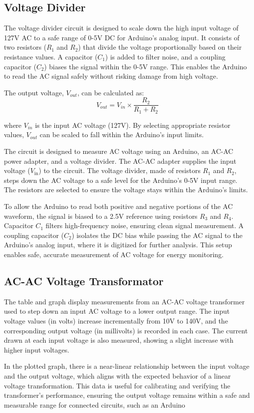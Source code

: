 \subsection{Voltage Divider}
The voltage divider circuit is designed to scale down the high input voltage of 127V AC to a safe range of 0-5V DC for Arduino's analog input. It consists of two resistors ($R_1$ and $R_2$) that divide the voltage proportionally based on their resistance values. A capacitor ($C_1$) is added to filter noise, and a coupling capacitor ($C_2$) biases the signal within the 0-5V range. This enables the Arduino to read the AC signal safely without risking damage from high voltage. \cite{OpenEnergyMonitor_Voltage}

The output voltage, $V_{out}$, can be calculated as:
$$ V_{out} = V_{in} \times \frac{R_2}{R_1 + R_2}$$

where $V_{in}$ is the input AC voltage (127V). By selecting appropriate resistor values, $V_{out}$ can be scaled to fall within the Arduino's input limits.

The circuit is designed to measure AC voltage using an Arduino, an AC-AC power adapter, and a voltage divider. The AC-AC adapter supplies the input voltage (\(V_{\text{in}}\)) to the circuit. The voltage divider, made of resistors \(R_1\) and \(R_2\), steps down the AC voltage to a safe level for the Arduino’s 0-5V input range. The resistors are selected to ensure the voltage stays within the Arduino’s limits.

To allow the Arduino to read both positive and negative portions of the AC waveform, the signal is biased to a 2.5V reference using resistors \(R_3\) and \(R_4\). Capacitor \(C_1\) filters high-frequency noise, ensuring clean signal measurement. A coupling capacitor (\(C_2\)) isolates the DC bias while passing the AC signal to the Arduino’s analog input, where it is digitized for further analysis. This setup enables safe, accurate measurement of AC voltage for energy monitoring. \cite{OpenEnergyMonitor_Voltage}

\subsection{AC-AC Voltage Transformator}
The table and graph display measurements from an AC-AC voltage transformer used to step down an input AC voltage to a lower output range. The input voltage values (in volts) increase incrementally from 10V to 140V, and the corresponding output voltage (in millivolts) is recorded in each case. The current drawn at each input voltage is also measured, showing a slight increase with higher input voltages.


In the plotted graph, there is a near-linear relationship between the input voltage and the output voltage, which aligns with the expected behavior of a linear voltage transformation. This data is useful for calibrating and verifying the transformer’s performance, ensuring the output voltage remains within a safe and measurable range for connected circuits, such as an Arduino

